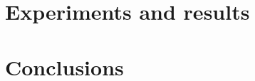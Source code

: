 \documentclass{llncs}
\begin{document}
\section{Experiments and results}
\section{Conclusions}
%
%
\begin{thebibliography}{}
%


\end{thebibliography}
%
\end{document}
